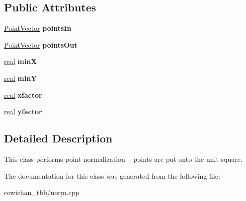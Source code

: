 \subsection*{Public Attributes}
\begin{CompactItemize}
\item 
\hypertarget{class_normalizer_02f117411f07fae9fc034885e69f298b}{
\hyperlink{class_point}{PointVector} \textbf{pointsIn}}
\label{class_normalizer_02f117411f07fae9fc034885e69f298b}

\item 
\hypertarget{class_normalizer_5f731c7abc673530d5da15a5b73b03f3}{
\hyperlink{class_point}{PointVector} \textbf{pointsOut}}
\label{class_normalizer_5f731c7abc673530d5da15a5b73b03f3}

\item 
\hypertarget{class_normalizer_d928591add8f6af2fc4943b6a3800242}{
\hyperlink{cowichan_8hpp_4d521b2c54a1f6312cc8fa04827eaf98}{real} \textbf{minX}}
\label{class_normalizer_d928591add8f6af2fc4943b6a3800242}

\item 
\hypertarget{class_normalizer_e154cea5c227b01fa743a18c20fc94bc}{
\hyperlink{cowichan_8hpp_4d521b2c54a1f6312cc8fa04827eaf98}{real} \textbf{minY}}
\label{class_normalizer_e154cea5c227b01fa743a18c20fc94bc}

\item 
\hypertarget{class_normalizer_e25d5be008bd7b298b0e3c2a7969ed77}{
\hyperlink{cowichan_8hpp_4d521b2c54a1f6312cc8fa04827eaf98}{real} \textbf{xfactor}}
\label{class_normalizer_e25d5be008bd7b298b0e3c2a7969ed77}

\item 
\hypertarget{class_normalizer_67a219d5d5e172dfca12b0a22bbe53a6}{
\hyperlink{cowichan_8hpp_4d521b2c54a1f6312cc8fa04827eaf98}{real} \textbf{yfactor}}
\label{class_normalizer_67a219d5d5e172dfca12b0a22bbe53a6}

\end{CompactItemize}


\subsection{Detailed Description}
This class performs point normalization -- points are put onto the unit square. 

The documentation for this class was generated from the following file:\begin{CompactItemize}
\item 
cowichan\_\-tbb/norm.cpp\end{CompactItemize}
